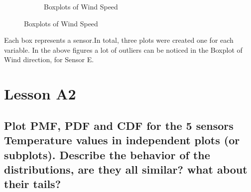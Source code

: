 \documentclass[a4paper,12pt]{article} %
\begin{document}
\begin{figure}[H]
\begin{subfigure}[b]{0.4\linewidth}
	\caption{Boxplots of Wind Speed}
\end{subfigure}
\end{figure}

Each box represents a sensor.In total, three plots were created one for each variable. In the above figures a lot of outliers can be noticed in the Boxplot of Wind direction, for Sensor E.

\section{ Lesson A2}

\subsection{Plot PMF, PDF and CDF for the 5 sensors Temperature values in independent plots (or subplots). Describe the behavior of the distributions, are they all similar? what about their tails?}
\end{document}

